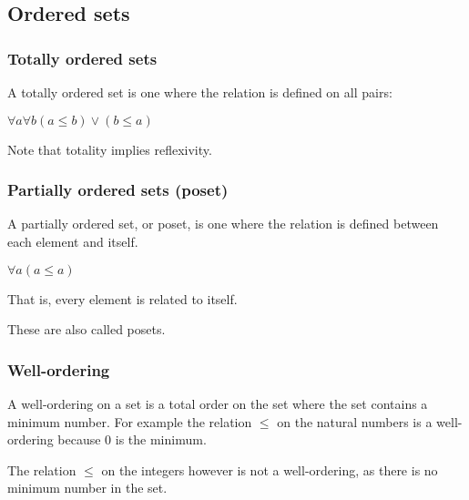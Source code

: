
\subsection{Ordered sets}

\subsubsection{Totally ordered sets}

A totally ordered set is one where the relation is defined on all pairs:

$\forall a \forall b	(a\le b)\lor (b\le a)$

Note that totality implies reflexivity.

\subsubsection{Partially ordered sets (poset)}

A partially ordered set, or poset, is one where the relation is defined between each element and itself.

$\forall a (a\le a)$

That is, every element is related to itself.

These are also called posets.

\subsubsection{Well-ordering}

A well-ordering on a set is a total order on the set where the set contains a minimum number. For example the relation \(\le \) on the natural numbers is a well-ordering because \(0\) is the minimum.

The relation \(\le \) on the integers however is not a well-ordering, as there is no minimum number in the set.

